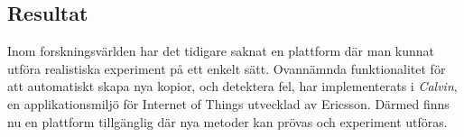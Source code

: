 \documentclass{article}
\begin{document}
\begin{multicols}{2}
\section*{Resultat}
Inom forskningsvärlden har det tidigare saknat en plattform där man kunnat utföra realistiska experiment på ett enkelt sätt. Ovannämnda funktionalitet för att automatiskt skapa nya kopior, och detektera fel, har implementerats i \emph{Calvin}, en applikationsmiljö för Internet of Things utvecklad av Ericsson. Därmed finns nu en plattform tillgänglig där nya metoder kan prövas och experiment utföras.

\end{multicols}
 
\end{document}
